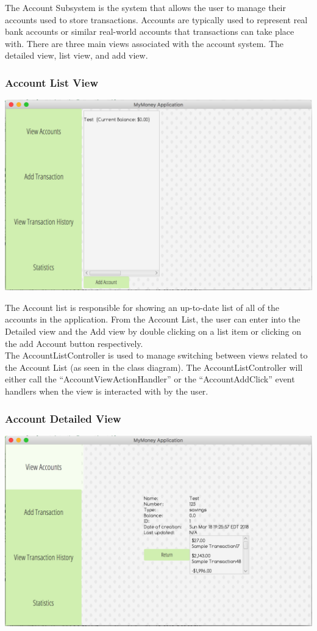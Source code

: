 \documentclass[12pt]{article}
\begin{document}
The Account Subsystem is the system that allows the user to manage
their accounts used to store transactions. Accounts are typically used
to represent real bank accounts or similar real-world accounts that transactions
can take place with. There are three main
views associated with the account system. The detailed view, list view, and add view.

\subsubsection{Account List View}

\includegraphics[scale=0.2]{accountlist}

The Account list is responsible for showing an up-to-date list of all of
the accounts in the application. From the Account List, the user can enter
into the Detailed view and the Add view by double clicking on a list item
or clicking on the add Account button respectively.\\

The AccountListController is used to manage switching between
views related to the Account List (as seen in the class diagram). 
The AccountListController will either call the 
``AccountViewActionHandler'' or the ``AccountAddClick'' event handlers
when the view is interacted with by the user.


\subsubsection{Account Detailed View}

\includegraphics[scale=0.2]{accountdetail}
\end{document}
